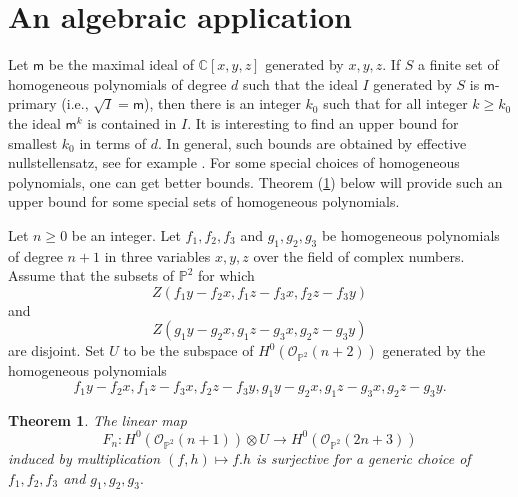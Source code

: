\documentclass[11pt]{amsart}
\newtheorem{thm}[subsection]{Theorem}
\theoremstyle{definition}
\begin{document}
\section{An algebraic application}
Let $\mathsf{m}$ be the maximal ideal of $\mathbb{C}[x,y,z]$ generated 
by $x,y,z.$ If $S$ a finite set of homogeneous polynomials of degree $d$
such that the ideal $I$ generated by $S$ is $\mathsf{m}$-primary (i.e.,
$\sqrt{I}= \mathsf{m}$), then there is an integer $k_0$ such that for
all integer $k \geq k_0$ the ideal $\mathsf{m}^k$ is contained in $I.$
It is interesting to find an upper bound for smallest $k_0$ in terms of 
$d.$ In general, such bounds are obtained by effective nullstellensatz,
see for example \cite{kollar1988sharp}. For some special choices of 
homogeneous polynomials, one can get better bounds. Theorem 
(\ref{thm33}) below will provide such an upper bound for some special
sets of homogeneous polynomials.

Let $n \geq 0$ be an integer. 
Let $f_1, f_2, f_3$ and $g_1, g_2, g_3$ be homogeneous polynomials of
degree $n+1$ in three variables $x,y,z$ over the field of complex 
numbers. Assume that the subsets 
of $\mathbb{P}^2$ for which 
\[Z(f_1y-f_2x, f_1z-f_3x,f_2z-f_3y) \]
and
\[ Z(g_1y-g_2x, g_1z-g_3x,g_2z-g_3y) \]
 are disjoint.  Set $ U$ to be the subspace of 
$H^0(\mathcal{O}_{\mathbb{P}^2}(n+2))$ generated by the homogeneous polynomials
\[f_1y-f_2x, f_1z-f_3x,f_2z-f_3y, g_1y-g_2x, g_1z-g_3x,g_2z-g_3y.\] 

\begin{thm}\label{thm33}
 The linear map 
  \[ F_n : H^0(\mathcal{O}_{\mathbb{P}^2}(n+1)) \otimes U \to H^0(\mathcal{O}_{\mathbb{P}^2}(2n+3))\]
  induced by multiplication $ (f , h) \mapsto f.h$ is surjective for a generic choice of 
  $f_1, f_2, f_3$ and $g_1, g_2, g_3.$
\end{thm}
\end{document}
